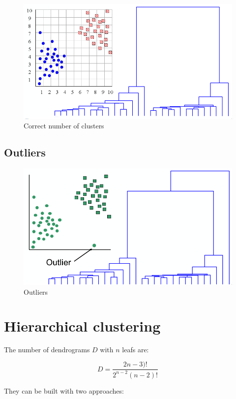 	\begin{figure}[H]
		\includegraphics[width=\textwidth]{correct-number}
		\caption{Correct number of clusters}
		\label{fig:correct-number}
	\end{figure}

	\subsection{Outliers}

	\begin{figure}[H]
		\includegraphics[width=\textwidth]{outliers}
		\caption{Outliers}
		\label{fig:dendrogram}
	\end{figure}

\section{Hierarchical clustering}
The number of dendrograms $D$ with $n$ leafs are:

$$D = \frac{2n-3)!}{2^{n-2}(n-2)!}$$

They can be built with two approaches:

